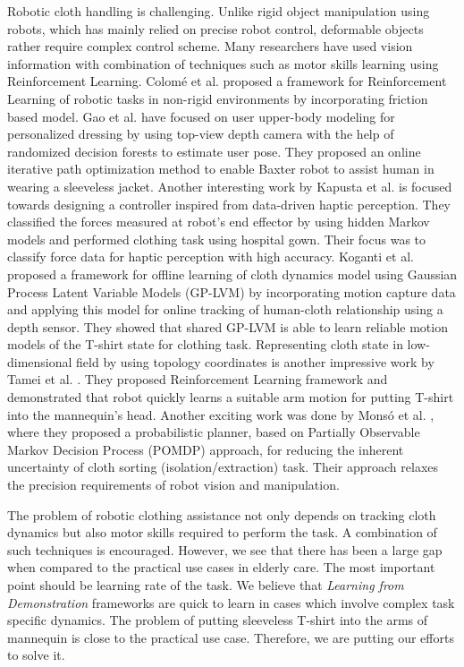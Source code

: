 \documentclass[sigconf]{acmart}
\begin{document}
Robotic cloth handling is challenging. Unlike rigid object manipulation using robots, which has mainly relied on precise robot control, deformable objects rather require complex control scheme. Many researchers have used vision information with combination of techniques such as motor skills learning using Reinforcement Learning. Colom{\'e} et al. \cite{colome2015friction} proposed a framework for Reinforcement Learning of robotic tasks in non-rigid environments by incorporating friction based model. Gao et al. \cite{gao2015user, gao2016iterative} have focused on user upper-body modeling for personalized dressing by using top-view depth camera with the help of randomized decision forests to estimate user pose. They proposed an online iterative path optimization method to enable Baxter robot to assist human in wearing a sleeveless jacket. Another interesting work by Kapusta et al. \cite{kapusta2016data} is focused towards designing a controller inspired from data-driven haptic perception. They classified the forces measured at robot's end effector by using hidden Markov models and performed clothing task using hospital gown. Their focus was to classify force data for haptic perception with high accuracy. Koganti et al. \cite{koganti2015cloth} proposed a framework for offline learning of cloth dynamics model using Gaussian Process Latent Variable Models (GP-LVM) by incorporating motion capture data and applying this model for online tracking of human-cloth relationship using a depth sensor. They showed that shared GP-LVM is able to learn reliable motion models of the T-shirt state for clothing task. Representing cloth state in low-dimensional field by using topology coordinates is another impressive work by Tamei et al. \cite{tamei2011reinforcement}. They proposed Reinforcement Learning framework and demonstrated that robot quickly learns a suitable arm motion for putting T-shirt into the mannequin's head. Another exciting work was done by Mons{\'o} et al. \cite{monso2012pomdp}, where they proposed a probabilistic planner, based on Partially Observable Markov Decision Process (POMDP) approach, for reducing the inherent uncertainty of cloth sorting (isolation/extraction) task. Their approach relaxes the precision requirements of robot vision and manipulation.

The problem of robotic clothing assistance not only depends on tracking cloth dynamics but also motor skills required to perform the task. A combination of such techniques is encouraged. However, we see that there has been a large gap when compared to the practical use cases in elderly care. The most important point should be learning rate of the task. We believe that \textit{Learning from Demonstration} frameworks are quick to learn in cases which involve complex task specific dynamics. The problem of putting sleeveless T-shirt into the arms of mannequin is close to the practical use case. Therefore, we are putting our efforts to solve it.
\end{document}
